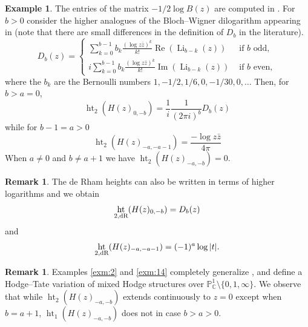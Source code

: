 \documentclass[11pt,a4paper]{amsart}
\newcommand{\dR}{\text{\rm dR}}
\newcommand{\C}{\mathds{C}}
\renewcommand{\P}{\mathds{P}}
\DeclareMathOperator{\im}{Im}
\DeclareMathOperator{\re}{Re}
\DeclareMathOperator{\Ht}{ht}
\DeclareMathOperator{\Li}{Li}
\numberwithin{equation}{section}
\theoremstyle{plain}
\theoremstyle{definition}
\newtheorem{rmk}[prop]{Remark}
\newtheorem{ex}[prop]{Example}
\begin{document}
\begin{ex}
  
  The entries of the matrix $-1/2 \log B(z)$ are computed in
  \cite[1.5]{beilinsondeligne:_inter_zagier}. For $b>0$ consider the
  higher analogues of the Bloch--Wigner
  dilogarithm appearing in \cite{beilinsondeligne:_inter_zagier} (note
  that there are small differences in the definition of $D_{b}$ in the
  literature).  
  \begin{displaymath}
    D_b(z)=
    \begin{cases}
            \sum_{k=0}^{b-1} b_k\frac{(\log z\bar
        z)^{k}}{k!}\re(\Li_{b-k}(z))&\text{ if }b \text{ odd},\\
      i\sum_{k=0}^{b-1} b_{k}\frac{(\log z\bar
      z)^{k}}{k!}\im(\Li_{b-k}(z))&\text{ if }b \text{ even},
    \end{cases}
  \end{displaymath}
  where the $b_{k}$ are the Bernoulli numbers $1,-1/2,1/6,0,-1/30,0,\dots$
    Then, for $b>a=0$,
  \begin{equation}\label{eq:45}
    \Ht_{2}(H(z)_{0,-b})=\frac{1}{i}\frac{1}{(2\pi i)^{b}}D_{b}(z)
  \end{equation}
  while for $b-1=a>0$
  \begin{equation}\label{eq:44}
    \Ht_{2}(H(z)_{-a,-a-1})=\frac{-\log
      z\bar z}{4\pi}
  \end{equation}
  When $a\not = 0$ and $b\not = a+1$ we have $\Ht_{2}(H(z)_{-a,-b})=0$.
\end{ex}

\begin{rmk}\label{rem:15}
  The de Rham heights can also be written in terms of higher logarithms
  and we obtain
  \begin{displaymath}
    \Ht_{2,\dR}(H(z)_{0,-b})=D_{b}(z)
  \end{displaymath}
  and
  \begin{displaymath}
    \Ht_{2,\dR}(H(z)_{-a,-a-1})=(-1)^{a}\log|t|.
  \end{displaymath}
\end{rmk}

\begin{rmk}\label{cont-ht}
Examples \ref{exm:2} and \ref{exm:14} completely generalize \cite[Example 6.7]{BGGP:Height}, and define a Hodge--Tate variation of mixed Hodge structures over
$\P^{1}_{\C}\setminus \{0,1,\infty\}$. We observe that while $\Ht_{2}(H(z)_{-a,-b})$ extends continuously to $z=0$
except when $b=a+1$, $\Ht_{1}(H(z)_{-a,-b})$ does not in case
$b>a>0$.
\end{rmk}
\end{document}
